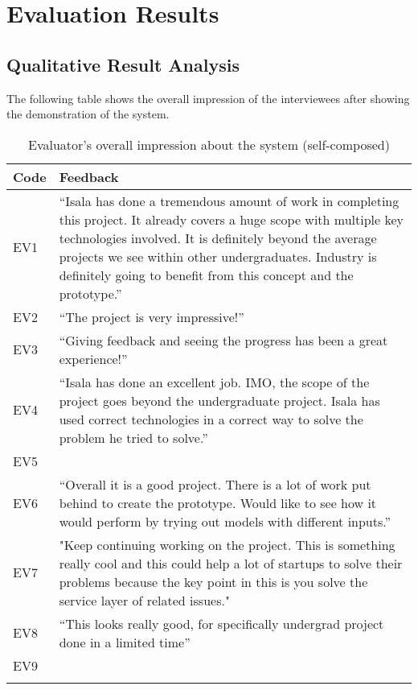 \section{Evaluation Results}

\subsection{Qualitative Result Analysis}

The following table shows the overall impression of the interviewees after showing the demonstration of the system.


\begin{longtable}{|p{8mm}|p{147mm}|}
    \hline
    \textbf{Code} & \textbf{Feedback} \\ \hline
    EV1 & “Isala has done a tremendous amount of work in completing this project. It already covers a huge scope with multiple key technologies involved. It is definitely beyond the average projects we see within other undergraduates. Industry is definitely going to benefit from this concept and the prototype.” \\ \hline
    EV2 & “The project is very impressive!” \\ \hline
    EV3 & “Giving feedback and seeing the progress has been a great experience!” \\ \hline
    EV4 & “Isala has done an excellent job. IMO, the scope of the project goes beyond the undergraduate project. Isala has used correct technologies in a correct way to solve the problem he tried to solve.” \\ \hline
    EV5 &  \\ \hline
    EV6 & “Overall it is a good project. There is a lot of work put behind to create the prototype. Would like to see how it would perform by trying out models with different inputs.” \\ \hline
    EV7 & "Keep continuing working on the project. This is something really cool and this could help a lot of startups to solve their problems because the key point in this is you solve the service layer of related issues." \\ \hline
    EV8 & “This looks really good, for specifically undergrad project done in a limited time” \\ \hline
    EV9 &  \\ \hline
    \caption{Evaluator's overall impression about the system (self-composed)}
\end{longtable}

